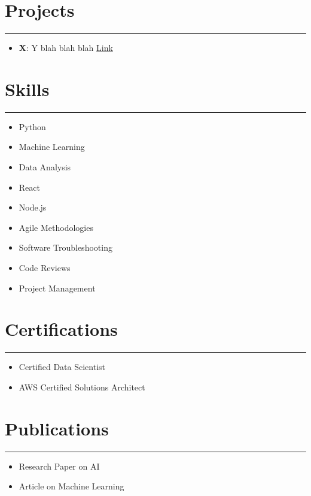 \documentclass[a4paper,10pt]{article}
\begin{document}
\section*{Projects}
\rule{\textwidth}{0.5pt}
\begin{itemize}[leftmargin=*]
\item \textbf{X}: Y blah blah blah \href{https://github.com/haveagoodday}{Link}
\end{itemize}

\section*{Skills}
\rule{\textwidth}{0.5pt}
\begin{itemize}[leftmargin=*]
\item Python
\item Machine Learning
\item Data Analysis
\item React
\item Node.js
\item Agile Methodologies
\item Software Troubleshooting
\item Code Reviews
\item Project Management
\end{itemize}

\section*{Certifications}
\rule{\textwidth}{0.5pt}
\begin{itemize}[leftmargin=*]
\item Certified Data Scientist
\item AWS Certified Solutions Architect
\end{itemize}

\section*{Publications}
\rule{\textwidth}{0.5pt}
\begin{itemize}[leftmargin=*]
\item Research Paper on AI
\item Article on Machine Learning
\end{itemize}
\end{document}
